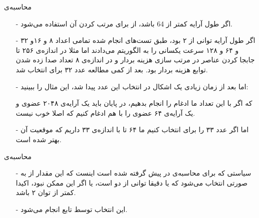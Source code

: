 \begin{frame}{محاسبه‌ی }
\begin{itemize}\itemr
\item[-]
اگر طول آرایه‌ کمتر از 64 باشد، از 
برای مرتب کردن آن استفاده می‌شود.

\item[-]
اگر طول آرایه توانی از ۲ بود، طبق تست‌های انجام شده تمامی اعداد ۸ و ۱۶و ۳۲ و ۶۴ و ۱۲۸ سرعت یکسانی را به الگوریتم می‌دادند اما مثلا در اندازه‌ی ۲۵۶ تا جابجا کردن عناصر در مرتب ‌سازی هزینه بردار و در انداز‌ه‌ی ۸ تعداد صدا زده شدن توابع هزینه‌ بردار بود. بعد از کمی مطالعه عدد ۳۲ برای  انتخاب شد.

\item[-]
اما بعد از زمان زیادی یک اشکال در انتخاب این عدد پیدا شد، این مثال را ببینید:
\begin{flushleft}
\end{flushleft}
که اگر با این تعداد  ما ادغام را انجام بدهیم، در پایان باید یک آرایه‌ی ۲۰۴۸ عضوی و یک آرایه‌ی ۶۴ عضوی را با هم ادغام کنیم که اصلا خوب نیست.

\item[-]
اما اگر عدد ۳۳ را برای  انتخاب کنیم ما ۶۴ تا  با اندازه‌ی ۳۳ داریم که موقعیت آن بهتر شده است.
\end{itemize}
\end{frame}

\begin{frame}[fragile]{محاسبه‌ی }
\begin{itemize}\itemr
\item[-]
سیاستی که برای محاسبه‌ی  در پیش گرفته شده است اینست که این مقدار از  به صورتی انتخاب می‌شود که  یا دقیقا توانی از دو است، یا اگر این ممکن نبود، اکیدا کمتر از توان ۲ باشد.

\item[-]
این انتخاب توسط تابع
انجام می‌شود.
\end{itemize}
\end{frame}
